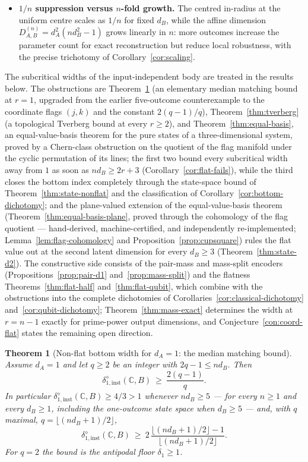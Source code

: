 \documentclass[11pt,a4paper]{article}
\newtheorem{theorem}{Theorem}[section]
\begin{document}
\begin{itemize}[leftmargin=*,itemsep=3pt]
\item \textbf{$1/n$ suppression versus $n$-fold growth.} The centred in-radius at the uniform centre scales as $1/n$ for fixed $d_B$, while the affine dimension $D_{A,B}^{(n)}=d_A^2(nd_B^2-1)$ grows linearly in $n$: more outcomes increase the parameter count for exact reconstruction but reduce local robustness, with the precise trichotomy of Corollary~\ref{cor:scaling}.
\end{itemize}

The subcritical widths of the input-independent body are treated in the results
below. The obstructions are Theorem~\ref{thm:nonflat-d1} (an elementary median
matching bound at $r=1$, upgraded from the earlier five-outcome counterexample to the
coordinate flags $(j,k)$ and the constant $2(q-1)/q$), Theorem~\ref{thm:tverberg}
(a topological Tverberg bound at every $r\ge2$), and Theorem~\ref{thm:equal-basis}, an
equal-value-basis theorem for the pure states of a three-dimensional system, proved
by a Chern-class obstruction on the quotient of the flag manifold under the cyclic
permutation of its lines; the first two bound every subcritical
width away from $1$ as soon as $nd_B\ge2r+3$ (Corollary~\ref{cor:flat-fails}), while
the third closes the bottom index completely through the state-space bound of Theorem~\ref{thm:state-nonflat} and the classification of Corollary~\ref{cor:bottom-dichotomy}; and the plane-valued extension of the equal-value-basis theorem (Theorem~\ref{thm:equal-basis-plane}, proved through the cohomology of the flag quotient --- hand-derived, machine-certified, and independently re-implemented; Lemma~\ref{lem:flag-cohomology} and Proposition~\ref{prop:cupsquare}) rules the flat value out at the second latent dimension for every $d_B\ge3$ (Theorem~\ref{thm:state-d2}). The
constructive side consists of the pair-mass and mass-split encoders
(Propositions~\ref{prop:pair-d1} and~\ref{prop:mass-split}) and the flatness
Theorems~\ref{thm:flat-half} and~\ref{thm:flat-qubit}, which combine with the
obstructions into the complete dichotomies of Corollaries~\ref{cor:classical-dichotomy}
and~\ref{cor:qubit-dichotomy}; Theorem~\ref{thm:mass-exact} determines the width at
$r=n-1$ exactly for prime-power output dimensions, and Conjecture~\ref{con:coord-flat}
states the remaining open direction.

\begin{theorem}[Non-flat bottom width for $d_A=1$: the median matching bound]
\label{thm:nonflat-d1}
Assume $d_A=1$ and let $q\ge2$ be an integer with $2q-1\le nd_B$. Then
\[
\delta_{1,\mathrm{inst}}^{\diamond}(\mathbb C,B)\ \ge\ \frac{2(q-1)}{q}.
\]
In particular $\delta_{1,\mathrm{inst}}^{\diamond}(\mathbb C,B)\ge4/3>1$ whenever
$nd_B\ge5$ --- for every $n\ge1$ and every $d_B\ge1$, including the one-outcome state
space when $d_B\ge5$ --- and, with $q$ maximal, $q=\lfloor(nd_B+1)/2\rfloor$,
\[
\delta_{1,\mathrm{inst}}^{\diamond}(\mathbb C,B)\ \ge\
2\,\frac{\lfloor(nd_B+1)/2\rfloor-1}{\lfloor(nd_B+1)/2\rfloor}.
\]
For $q=2$ the bound is the antipodal floor $\delta_1\ge1$.
\end{theorem}
\end{document}
